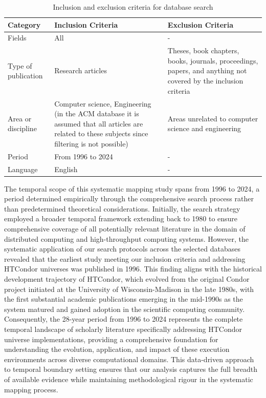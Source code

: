 \begin{table}[ht]
\renewcommand{\arraystretch}{1.3}
    \centering
	\caption{Inclusion and exclusion criteria for database search}
    \begin{tabular}{p{2.7cm}p{6.5cm}p{6.5cm}}
        \hline
        \textbf{Category} & \textbf{Inclusion Criteria} & \textbf{Exclusion Criteria} \\
        \hline
        Fields & All & - \\
        Type of publication & Research articles & Theses, book chapters, books, journals, proceedings, papers, and anything not covered by the inclusion criteria \\
        Area or discipline & Computer science, Engineering (in the ACM database it is assumed that all articles are related to these subjects since filtering is not possible) & Areas unrelated to computer science and engineering \\
        Period & From 1996 to 2024 & - \\
        Language & English & - \\
        \hline
    \end{tabular}
	\label{table:Criteria}
\end{table}

The temporal scope of this systematic mapping study spans from 1996 to 2024, a period determined empirically through the comprehensive search process rather than predetermined theoretical considerations. Initially, the search strategy employed a broader temporal framework extending back to 1980 to ensure comprehensive coverage of all potentially relevant literature in the domain of distributed computing and high-throughput computing systems. However, the systematic application of our search protocols across the selected databases revealed that the earliest study meeting our inclusion criteria and addressing HTCondor universes was published in 1996. This finding aligns with the historical development trajectory of HTCondor, which evolved from the original Condor project initiated at the University of Wisconsin-Madison in the late 1980s, with the first substantial academic publications emerging in the mid-1990s as the system matured and gained adoption in the scientific computing community. Consequently, the 28-year period from 1996 to 2024 represents the complete temporal landscape of scholarly literature specifically addressing HTCondor universe implementations, providing a comprehensive foundation for understanding the evolution, application, and impact of these execution environments across diverse computational domains. This data-driven approach to temporal boundary setting ensures that our analysis captures the full breadth of available evidence while maintaining methodological rigour in the systematic mapping process.


